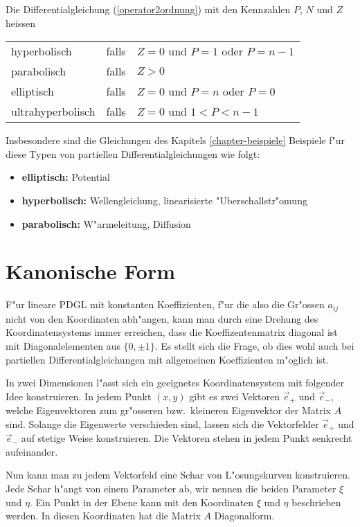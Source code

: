 \begin{definition} Die Differentialgleichung 
(\ref{operator2ordnung})
mit den Kennzahlen $P$, $N$ und $Z$ heissen
\begin{center}
\begin{tabular}{lcl}
hyperbolisch&falls&$Z=0$ und $P=1$ oder $P=n-1$\\
parabolisch&falls&$Z>0$\\
elliptisch&falls&$Z=0$ und $P=n$ oder $P=0$\\
ultrahyperbolisch&falls&$Z=0$ und $1<P<n-1$
\end{tabular}
\end{center}
\end{definition}
Insbesondere sind die Gleichungen des Kapitels \ref{chapter-beispiele}
Beispiele f"ur diese Typen von partiellen Differentialgleichungen
wie folgt:
\begin{itemize}
\item {\bf elliptisch:} Potential
\item {\bf hyperbolisch:} Wellengleichung, linearisierte "Uberschallstr"omung
\item {\bf parabolisch:} W"armeleitung, Diffusion
\end{itemize}

\section{Kanonische Form}
F"ur lineare PDGL mit konstanten Koeffizienten, f"ur die also die Gr"ossen
$a_{ij}$ nicht von den Koordinaten abh"angen, kann man durch eine Drehung
des Koordinatensystems immer erreichen, dass die Koeffizentenmatrix diagonal
ist mit Diagonalelementen aus $\{0,\pm1\}$. Es stellt sich die Frage, ob
dies wohl auch bei partiellen Differentialgleichungen mit allgemeinen
Koeffizienten m"oglich ist.

In zwei Dimensionen l"asst sich ein geeignetes Koordinatensystem mit folgender
Idee konstruieren. 
In jedem Punkt $(x,y)$ gibt es zwei Vektoren $\vec e_+$ und
$\vec e_-$, welche Eigenvektoren zum gr"osseren bzw.~kleineren Eigenvektor
der Matrix $A$ sind. Solange die Eigenwerte verschieden sind, lassen sich
die Vektorfelder $\vec e_+$ und $\vec e_-$ auf stetige Weise konstruieren.
Die Vektoren stehen in jedem Punkt senkrecht aufeinander.

Nun kann man zu jedem Vektorfeld eine Schar von L"osungskurven
konstruieren. Jede Schar h"angt von einem Parameter ab, wir nennen die
beiden Parameter $\xi$ und $\eta$. Ein Punkt in der Ebene kann mit
den Koordinaten $\xi$ und $\eta$ beschrieben werden.
In diesen Koordinaten hat die Matrix $A$ Diagonalform.

